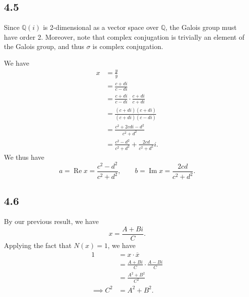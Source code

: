 \documentclass[11pt, letterpaper]{article}
\begin{document}
\subsection*{4.5}
Since $\mathbb{Q} (i)$ is 2-dimensional as a vector space over $\mathbb{Q} $, the Galois group must have order 2. Moreover, note that complex conjugation is trivially an element of the Galois group, and thus $\sigma $ is complex conjugation.

We have
\begin{align*}
	x&=\frac{y}{\overline{y} } \\
	 &=\frac{c+di}{c-di} \\
	 &=\frac{c+di}{c-di} \cdot \frac{c+di}{c+di} \\
	 &=\frac{\left( c+di \right) \left( c+di \right) }{\left( c+di \right) \left( c-di \right) } \\
	 &=\frac{c^2+2cdi-d^2}{c^2+d^2} \\
	 &=\frac{c^2-d^2}{c^2+d^2} +\frac{2cd}{c^2+d^2} i
.\end{align*}
We thus have
\[
	a=\operatorname{Re} x=\frac{c^2-d^2}{c^2+d^2} ,\qquad b=\operatorname{Im} x=\frac{2cd}{c^2+d^2} 
.\]
\subsection*{4.6}
By our previous result, we have
\[
	x=\frac{A+Bi}{C} 
.\]
Applying the fact that $N(x)=1$, we have
\begin{align*}
	1&= x\cdot \overline{x} \\
	 &=\frac{A+Bi}{C} \cdot \frac{A-Bi}{C} \\
	 &=\frac{A^2+B^2}{C^2} \\
	\implies C^2 &=A^2+B^2
.\end{align*}
\end{document}
